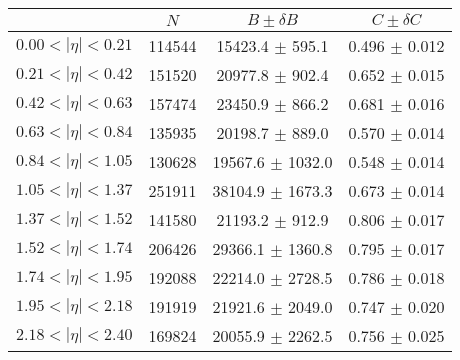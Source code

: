 \begin{tabular}{lccc}
\hline
    &   $N$   & $B \pm \delta B$  &  $C \pm \delta C$ \\
\hline
$0.00 < |\eta| <0.21$          & 114544     & 15423.4    $\pm$ 595.1 & 0.496      $\pm$ 0.012 \\
$0.21 < |\eta| <0.42$          & 151520     & 20977.8    $\pm$ 902.4 & 0.652      $\pm$ 0.015 \\
$0.42 < |\eta| <0.63$          & 157474     & 23450.9    $\pm$ 866.2 & 0.681      $\pm$ 0.016 \\
$0.63 < |\eta| <0.84$          & 135935     & 20198.7    $\pm$ 889.0 & 0.570      $\pm$ 0.014 \\
$0.84 < |\eta| <1.05$          & 130628     & 19567.6    $\pm$ 1032.0 & 0.548      $\pm$ 0.014 \\
$1.05 < |\eta| <1.37$          & 251911     & 38104.9    $\pm$ 1673.3 & 0.673      $\pm$ 0.014 \\
$1.37 < |\eta| <1.52$          & 141580     & 21193.2    $\pm$ 912.9 & 0.806      $\pm$ 0.017 \\
$1.52 < |\eta| <1.74$          & 206426     & 29366.1    $\pm$ 1360.8 & 0.795      $\pm$ 0.017 \\
$1.74 < |\eta| <1.95$          & 192088     & 22214.0    $\pm$ 2728.5 & 0.786      $\pm$ 0.018 \\
$1.95 < |\eta| <2.18$          & 191919     & 21921.6    $\pm$ 2049.0 & 0.747      $\pm$ 0.020 \\
$2.18 < |\eta| <2.40$          & 169824     & 20055.9    $\pm$ 2262.5 & 0.756      $\pm$ 0.025 \\
\hline
\end{tabular}
